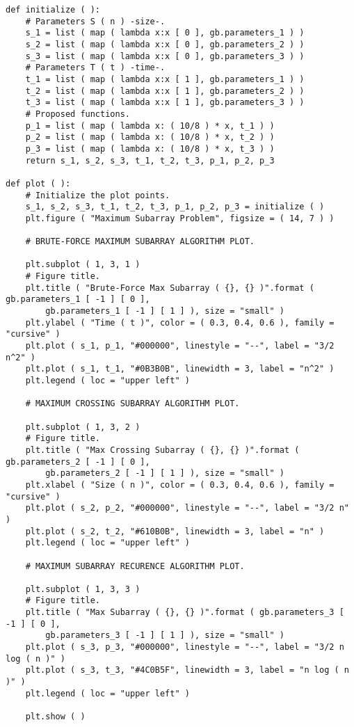 \begin{lstlisting}
def initialize ( ):
    # Parameters S ( n ) -size-.
    s_1 = list ( map ( lambda x:x [ 0 ], gb.parameters_1 ) )
    s_2 = list ( map ( lambda x:x [ 0 ], gb.parameters_2 ) )
    s_3 = list ( map ( lambda x:x [ 0 ], gb.parameters_3 ) )
    # Parameters T ( t ) -time-.
    t_1 = list ( map ( lambda x:x [ 1 ], gb.parameters_1 ) )
    t_2 = list ( map ( lambda x:x [ 1 ], gb.parameters_2 ) )
    t_3 = list ( map ( lambda x:x [ 1 ], gb.parameters_3 ) )
    # Proposed functions.
    p_1 = list ( map ( lambda x: ( 10/8 ) * x, t_1 ) )
    p_2 = list ( map ( lambda x: ( 10/8 ) * x, t_2 ) )
    p_3 = list ( map ( lambda x: ( 10/8 ) * x, t_3 ) )
    return s_1, s_2, s_3, t_1, t_2, t_3, p_1, p_2, p_3
    
def plot ( ):
    # Initialize the plot points.
    s_1, s_2, s_3, t_1, t_2, t_3, p_1, p_2, p_3 = initialize ( )
    plt.figure ( "Maximum Subarray Problem", figsize = ( 14, 7 ) )

    # BRUTE-FORCE MAXIMUM SUBARRAY ALGORITHM PLOT.

    plt.subplot ( 1, 3, 1 )
    # Figure title.
    plt.title ( "Brute-Force Max Subarray ( {}, {} )".format ( gb.parameters_1 [ -1 ] [ 0 ], 
    	gb.parameters_1 [ -1 ] [ 1 ] ), size = "small" )
    plt.ylabel ( "Time ( t )", color = ( 0.3, 0.4, 0.6 ), family = "cursive" )
    plt.plot ( s_1, p_1, "#000000", linestyle = "--", label = "3/2 n^2" )
    plt.plot ( s_1, t_1, "#0B3B0B", linewidth = 3, label = "n^2" )
    plt.legend ( loc = "upper left" )

    # MAXIMUM CROSSING SUBARRAY ALGORITHM PLOT.

    plt.subplot ( 1, 3, 2 )
    # Figure title.
    plt.title ( "Max Crossing Subarray ( {}, {} )".format ( gb.parameters_2 [ -1 ] [ 0 ], 
    	gb.parameters_2 [ -1 ] [ 1 ] ), size = "small" )
    plt.xlabel ( "Size ( n )", color = ( 0.3, 0.4, 0.6 ), family = "cursive" )
    plt.plot ( s_2, p_2, "#000000", linestyle = "--", label = "3/2 n" )
    plt.plot ( s_2, t_2, "#610B0B", linewidth = 3, label = "n" )
    plt.legend ( loc = "upper left" )

    # MAXIMUM SUBARRAY RECURENCE ALGORITHM PLOT.

    plt.subplot ( 1, 3, 3 )
    # Figure title.
    plt.title ( "Max Subarray ( {}, {} )".format ( gb.parameters_3 [ -1 ] [ 0 ], 
    	gb.parameters_3 [ -1 ] [ 1 ] ), size = "small" )
    plt.plot ( s_3, p_3, "#000000", linestyle = "--", label = "3/2 n log ( n )" )
    plt.plot ( s_3, t_3, "#4C0B5F", linewidth = 3, label = "n log ( n )" )
    plt.legend ( loc = "upper left" )

    plt.show ( )
\end{lstlisting}

\pagebreak